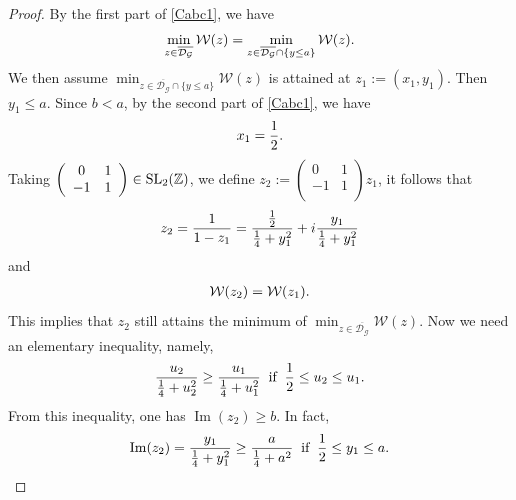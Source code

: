 \documentclass[reqno,english]{amsart}
\newtheorem{open problem}{Open Problem}[section]
\newtheorem{open question}{Open Question}[section]
\newtheorem{open questions on hexagonal lattice}{Open Questions on hexagonal lattice}[section]
\renewcommand{\Im}{\operatorname{Im}}
\begin{document}
\begin{proof}
By the first part of \eqref{Cabc1}, we have
\begin{equation}\aligned\nonumber
\min_{z\in\overline{\mathcal{D}_{\mathcal{G}}}}\mathcal{W}(z)=\min_{z\in\overline{\mathcal{D}_{\mathcal{G}}}\cap\{y\leq a\}}\mathcal{W}(z).
\endaligned\end{equation}
We then assume $\min_{z\in\overline{\mathcal{D}_{\mathcal{G}}}\cap\{y\leq a\}}\mathcal{W}(z)$ is attained at $z_1:=(x_1,y_1)$.
Then $y_1\leq a$. Since $b<a$, by the second part of \eqref{Cabc1}, we have
\begin{equation}\aligned\label{xxx}
x_1=\frac{1}{2}.
\endaligned\end{equation}
Taking $\left(
                                                                      \begin{array}{cc}
                                                                        0 & 1 \\
                                                                        -1 & 1 \\
                                                                      \end{array}
                                                                    \right)\in \hbox{SL}_2(\mathbb{Z})$,
                                                                    we define
$z_2:=\left(
                                                                      \begin{array}{cc}
                                                                        0 & 1 \\
                                                                        -1 & 1 \\
                                                                      \end{array}
                                                                    \right)z_1$, it follows that
\begin{equation}\aligned\nonumber
z_2=\frac{1}{1-z_1}=\frac{\frac{1}{2}}{\frac{1}{4}+y_1^2}+i \frac{y_1}{\frac{1}{4}+y_1^2}
 \endaligned\end{equation}
and
 \begin{equation}\aligned\nonumber
\mathcal{W}(z_2)=\mathcal{W}(z_1).
 \endaligned\end{equation}
 This implies that $z_2$ still attains the minimum of $\min_{z\in\overline{\mathcal{D}_{\mathcal{G}}}}\mathcal{W}(z)$.
 Now we need an elementary inequality, namely,
  \begin{equation}\aligned\nonumber
\frac{u_2}{\frac{1}{4}+u_2^2}\geq\frac{u_1}{\frac{1}{4}+u_1^2}\;\;\hbox{if}\;\;\frac{1}{2}\leq u_2\leq u_1.
 \endaligned\end{equation}
 From this inequality, one has $\Im(z_2)\geq b$. In fact,
  \begin{equation}\aligned\nonumber
\Im(z_2)=\frac{y_1}{\frac{1}{4}+y_1^2}\geq\frac{a}{\frac{1}{4}+a^2}\;\;\hbox{if}\;\;\frac{1}{2}\leq y_1\leq a.
 \endaligned\end{equation}



\end{proof}
\end{document}
